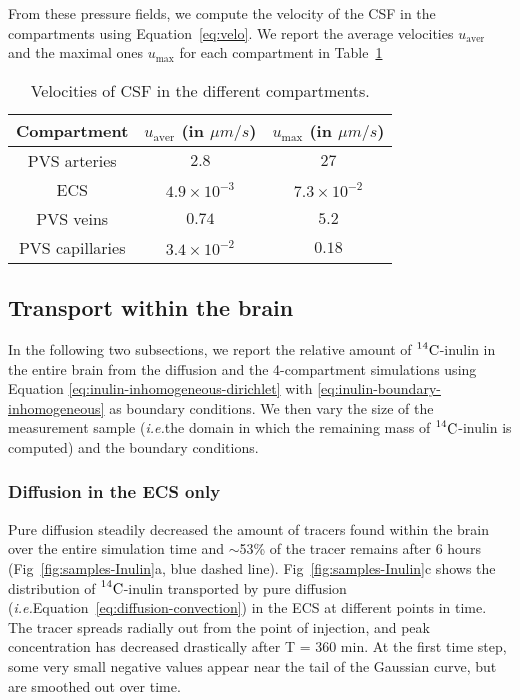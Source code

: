 \documentclass[10pt]{article}
\newcommand{\ie}{\emph{i.e.}\;}
\newcommand{\1}{^{(1)}}
\newcommand{\2}{^{(2)}}
\newcommand{\Cinulin}{$\prescript{14}{}{\text{C}}$-inulin }
\begin{document}
From these pressure fields, we compute the velocity of the CSF in the compartments using Equation~\eqref{eq:velo}. We report the average velocities $u_\text{aver}$ and the maximal ones $u_\text{max}$ for each compartment in Table~\ref{tab:velocities-baseline}

\begin{table}[]
    \centering
    \begin{tabular}{c|c|c}
       Compartment & $u_\text{aver}$ (in $\si{\mu m/s}$) & $u_\text{max}$ (in $\si{\mu m/s}$) \\
       \hline
    
        PVS arteries & $2.8$ & $27$ \\
        ECS &  $4.9\times 10^{-3}$ & $7.3 \times 10^{-2}$ \\
        PVS veins & $0.74$ & $5.2$ \\
        PVS capillaries & $3.4\times 10^{-2}$ & $0.18$
    \end{tabular}
    \caption{Velocities of CSF in the different compartments.}
    \label{tab:velocities-baseline}
\end{table}

\subsection{Transport within the brain}
In the following two subsections, we report the relative amount of \Cinulin in the entire brain from the diffusion and the 4-compartment simulations using Equation \eqref{eq:inulin-inhomogeneous-dirichlet} with \eqref{eq:inulin-boundary-inhomogeneous} as boundary conditions. We then vary the size of the measurement sample (\ie the domain in which the remaining mass of \Cinulin is computed) and the boundary conditions. 
\subsubsection{Diffusion in the ECS only}
Pure diffusion steadily decreased the amount of tracers found within the brain over the entire simulation time and $\sim$53\% of the tracer remains after 6 hours (Fig~\ref{fig:samples-Inulin}a, blue dashed line). Fig~\ref{fig:samples-Inulin}c shows the distribution of \Cinulin transported by pure diffusion (\ie Equation~\eqref{eq:diffusion-convection}) in the ECS at different points in time. The tracer spreads radially out from the point of injection, and peak concentration has decreased drastically after T = 360 min. At the first time step, some very small negative values appear near the tail of the Gaussian curve, but are smoothed out over time. 
\end{document}

